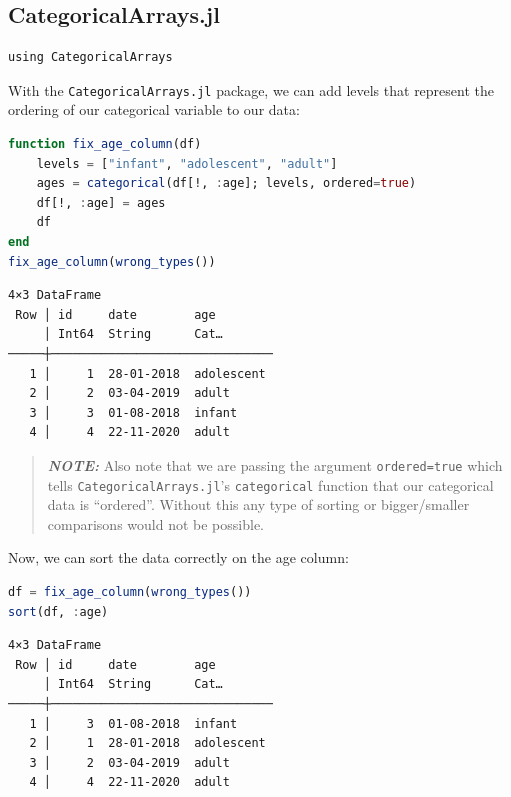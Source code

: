 \documentclass[
  notoc %
]{tufte-book}
\newcommand{\passthrough}[1]{#1}
\begin{document}
\hypertarget{sec:categoricalarrays}{%
\subsection{CategoricalArrays.jl}\label{sec:categoricalarrays}}

\begin{lstlisting}
using CategoricalArrays
\end{lstlisting}

With the \passthrough{\lstinline!CategoricalArrays.jl!} package, we can
add levels that represent the ordering of our categorical variable to
our data:

\begin{lstlisting}[language=Julia]
function fix_age_column(df)
    levels = ["infant", "adolescent", "adult"]
    ages = categorical(df[!, :age]; levels, ordered=true)
    df[!, :age] = ages
    df
end
fix_age_column(wrong_types())
\end{lstlisting}

\begin{lstlisting}[language=Output]
4×3 DataFrame
 Row │ id     date        age
     │ Int64  String      Cat…
─────┼───────────────────────────────
   1 │     1  28-01-2018  adolescent
   2 │     2  03-04-2019  adult
   3 │     3  01-08-2018  infant
   4 │     4  22-11-2020  adult
\end{lstlisting}

\begin{quote}
\textbf{\emph{NOTE:}} Also note that we are passing the argument
\passthrough{\lstinline!ordered=true!} which tells
\passthrough{\lstinline!CategoricalArrays.jl!}'s
\passthrough{\lstinline!categorical!} function that our categorical data
is ``ordered''. Without this any type of sorting or bigger/smaller
comparisons would not be possible.
\end{quote}

Now, we can sort the data correctly on the age column:

\begin{lstlisting}[language=Julia]
df = fix_age_column(wrong_types())
sort(df, :age)
\end{lstlisting}

\begin{lstlisting}[language=Output]
4×3 DataFrame
 Row │ id     date        age
     │ Int64  String      Cat…
─────┼───────────────────────────────
   1 │     3  01-08-2018  infant
   2 │     1  28-01-2018  adolescent
   3 │     2  03-04-2019  adult
   4 │     4  22-11-2020  adult
\end{lstlisting}
\end{document}

